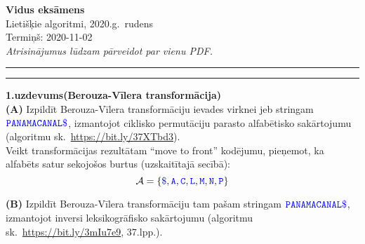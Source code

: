 \documentclass[a4paper,12pt]{article}
\begin{document}
\thispagestyle{empty}

\begin{center}
{\bf\Huge Vidus eksāmens} \\[5pt]
Lietišķie algoritmi, 2020.g.\ rudens \\
Termiņš: 2020-11-02\\[5pt]
{\em Atrisinājumus lūdzam pārveidot par vienu PDF.}
\end{center}

\hrule
\vspace{2pt}
\hrule
\vspace{12pt}



\vspace{10pt}
{\bf 1.uzdevums(Berouza-Vīlera trans\-for\-mā\-ci\-ja)}\\
{\bf (A)} Izpildīt Berouza-Vīlera transformāciju ie\-va\-des virknei jeb stringam
$\textcolor{blue}{\mathtt{PANAMACANAL\$}}$, izmantojot 
ciklisko permutāciju parasto alfabētisko sakārtojumu 
(algoritmu sk.\ \url{https://bit.ly/37XTbd3}).\\
Veikt transformācijas rezultātam ``move to front'' kodējumu, 
pieņemot, ka alfabēts satur sekojošos burtus (uzskaitītajā secībā): 
$$\mathcal{A}=\{\textcolor{blue}{\mathtt{\$}},\textcolor{blue}{\mathtt{A}},\textcolor{blue}{\mathtt{C}},
\textcolor{blue}{\mathtt{L}},\textcolor{blue}{\mathtt{M}},\textcolor{blue}{\mathtt{N}},\textcolor{blue}{\mathtt{P}} \}$$

{\bf (B)} Izpildīt Berouza-Vīlera transformāciju tam pa\-šam stringam 
$\textcolor{blue}{\mathtt{PANAMACANAL\$}}$, izmantojot inversi leksikogrāfisko sakārtojumu 
(algoritmu sk.\ \url{https://bit.ly/3mIu7e9}, 37.lpp.). 
\end{document}
